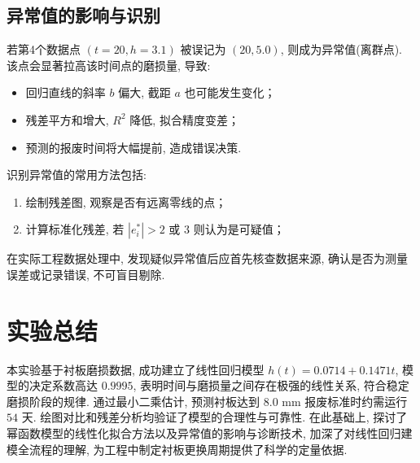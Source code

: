 \documentclass[12pt,a4paper]{ctexart}
\begin{document}
\subsection{异常值的影响与识别}
若第4个数据点 $(t=20, h=3.1)$ 被误记为 $(20, 5.0)$, 则成为异常值(离群点). 该点会显著拉高该时间点的磨损量, 导致: 
\begin{itemize}
    \item 回归直线的斜率 $b$ 偏大, 截距 $a$ 也可能发生变化；
    \item 残差平方和增大, $R^2$ 降低, 拟合精度变差；
    \item 预测的报废时间将大幅提前, 造成错误决策. 
\end{itemize}
识别异常值的常用方法包括: 
\begin{enumerate}
    \item 绘制残差图, 观察是否有远离零线的点；
    \item 计算标准化残差, 若 $|e_i^*| > 2$ 或 $3$ 则认为是可疑值；
\end{enumerate}
在实际工程数据处理中, 发现疑似异常值后应首先核查数据来源, 确认是否为测量误差或记录错误, 不可盲目剔除. 

\section{实验总结}
本实验基于衬板磨损数据, 成功建立了线性回归模型 $h(t)=0.0714+0.1471t$, 模型的决定系数高达 $0.9995$, 表明时间与磨损量之间存在极强的线性关系, 符合稳定磨损阶段的规律. 通过最小二乘估计, 预测衬板达到 $8.0$ mm 报废标准时约需运行 $54$ 天. 绘图对比和残差分析均验证了模型的合理性与可靠性. 在此基础上, 探讨了幂函数模型的线性化拟合方法以及异常值的影响与诊断技术, 加深了对线性回归建模全流程的理解, 为工程中制定衬板更换周期提供了科学的定量依据. 
\end{document}
